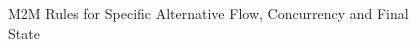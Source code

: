 \begin{figure}[H]
\centering
{}
\caption{M2M Rules for Specific Alternative Flow, Concurrency and Final State}
\label{fig:m2mrulesdiagram3}
\end{figure}


